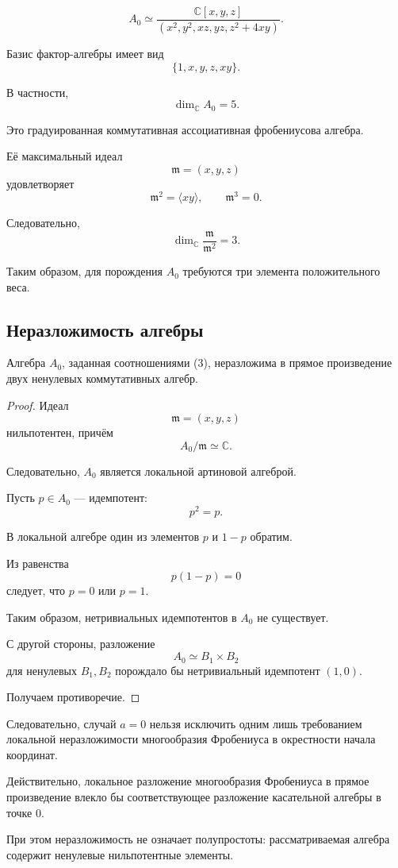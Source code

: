 \begin{equation}
A_0\simeq\dfrac{\mathbb{C}[x,y,z]}
{(x^2,y^2,xz,yz,z^2+4xy)}.
\label{factor_D_5}
\end{equation}

Базис фактор-алгебры имеет вид
\[\{1,x,y,z,xy\}.\]

В частности,
\[
\dim_{\mathbb C}A_0=5.
\]

Это градуированная коммутативная
ассоциативная фробениусова алгебра.

Её максимальный идеал
\[
\mathfrak m=(x,y,z)
\]
удовлетворяет
\[
\mathfrak m^2=\langle xy\rangle,
\qquad
\mathfrak m^3=0.
\]

Следовательно,
\[
\dim_{\mathbb C}
\frac{\mathfrak m}{\mathfrak m^2}=3.
\]

Таким образом, для порождения $A_0$
требуются три элемента положительного веса.

\subsection{Неразложимость алгебры}


\begin{prop}
	Алгебра $A_0$, заданная соотношениями (3),
	неразложима в прямое произведение двух
	ненулевых коммутативных алгебр.
\end{prop}

\begin{proof}
	Идеал
	\[
	\mathfrak m=(x,y,z)
	\]
	нильпотентен, причём
	\[
	A_0/\mathfrak m\simeq\mathbb C.
	\]
	
	Следовательно, $A_0$ является локальной
	артиновой алгеброй.
	
	Пусть $p\in A_0$ --- идемпотент:
	\[
	p^2=p.
	\]
	
	В локальной алгебре один из элементов
	$p$ и $1-p$ обратим.
	
	Из равенства
	\[
	p(1-p)=0
	\]
	следует, что $p=0$ или $p=1$.
	
	Таким образом, нетривиальных идемпотентов
	в $A_0$ не существует.
	
	С другой стороны, разложение
	\[
	A_0\simeq B_1\times B_2
	\]
	для ненулевых $B_1,B_2$ порождало бы
	нетривиальный идемпотент $(1,0)$.
	
	Получаем противоречие.
\end{proof}

\begin{remark}
	Следовательно, случай $a=0$ нельзя исключить
	одним лишь требованием локальной
	неразложимости многообразия Фробениуса
	в окрестности начала координат.
	
	Действительно, локальное разложение
	многообразия Фробениуса в прямое произведение
	влекло бы соответствующее разложение
	касательной алгебры в точке $0$.
	
	При этом неразложимость не означает
	полупростоты: рассматриваемая алгебра
	содержит ненулевые нильпотентные элементы.
\end{remark}
\iffalse
